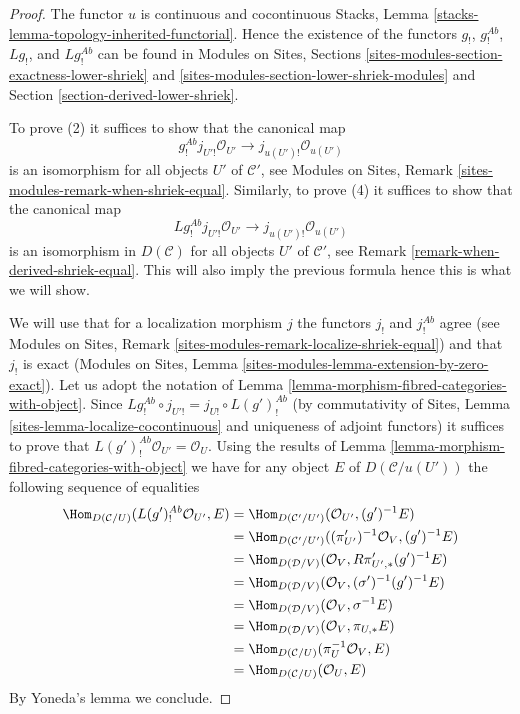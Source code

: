 \begin{proof}
The functor $u$ is continuous and cocontinuous
Stacks, Lemma \ref{stacks-lemma-topology-inherited-functorial}.
Hence the existence of the functors $g_!$, $g_!^{\textit{Ab}}$,
$Lg_!$, and $Lg_!^{\textit{Ab}}$ can be found in
Modules on Sites, Sections
\ref{sites-modules-section-exactness-lower-shriek} and
\ref{sites-modules-section-lower-shriek-modules}
and
Section \ref{section-derived-lower-shriek}.

\medskip\noindent
To prove (2) it suffices to show that the canonical map
$$
g_!^{\textit{Ab}}j_{U'!}\mathcal{O}_{U'} \to j_{u(U')!}\mathcal{O}_{u(U')}
$$
is an isomorphism for all objects $U'$ of $\mathcal{C}'$, see
Modules on Sites, Remark \ref{sites-modules-remark-when-shriek-equal}.
Similarly, to prove (4) it suffices to show that the canonical map
$$
Lg_!^{\textit{Ab}}j_{U'!}\mathcal{O}_{U'} \to j_{u(U')!}\mathcal{O}_{u(U')}
$$
is an isomorphism in $D(\mathcal{C})$ for all objects $U'$ of
$\mathcal{C}'$, see Remark \ref{remark-when-derived-shriek-equal}.
This will also imply the previous formula hence this is what we will show.

\medskip\noindent
We will use that for a localization morphism $j$ the
functors $j_!$ and $j_!^{\textit{Ab}}$ agree (see
Modules on Sites, Remark \ref{sites-modules-remark-localize-shriek-equal})
and that $j_!$ is exact
(Modules on Sites, Lemma \ref{sites-modules-lemma-extension-by-zero-exact}).
Let us adopt the notation of
Lemma \ref{lemma-morphism-fibred-categories-with-object}.
Since $Lg_!^{\textit{Ab}} \circ j_{U'!} = j_{U!} \circ L(g')^{\textit{Ab}}_!$
(by commutativity of Sites, Lemma \ref{sites-lemma-localize-cocontinuous}
and uniqueness of adjoint functors) it suffices to prove that
$L(g')^{\textit{Ab}}_!\mathcal{O}_{U'} = \mathcal{O}_U$. Using the
results of
Lemma \ref{lemma-morphism-fibred-categories-with-object}
we have for any object $E$ of $D(\mathcal{C}/u(U'))$ the following
sequence of equalities
\begin{align*}
\Hom_{D(\mathcal{C}/U)}(L(g')_!^{\textit{Ab}}\mathcal{O}_{U'}, E)
& =
\Hom_{D(\mathcal{C}'/U')}(\mathcal{O}_{U'}, (g')^{-1}E) \\
& =
\Hom_{D(\mathcal{C}'/U')}((\pi'_{U'})^{-1}\mathcal{O}_V, (g')^{-1}E) \\
& =
\Hom_{D(\mathcal{D}/V)}(\mathcal{O}_V, R\pi'_{U', *}(g')^{-1}E) \\
& =
\Hom_{D(\mathcal{D}/V)}(\mathcal{O}_V, (\sigma')^{-1}(g')^{-1}E) \\
& =
\Hom_{D(\mathcal{D}/V)}(\mathcal{O}_V, \sigma^{-1}E) \\
& =
\Hom_{D(\mathcal{D}/V)}(\mathcal{O}_V, \pi_{U, *}E) \\
& =
\Hom_{D(\mathcal{C}/U)}(\pi_U^{-1}\mathcal{O}_V, E) \\
& =
\Hom_{D(\mathcal{C}/U)}(\mathcal{O}_U, E)
\end{align*}
By Yoneda's lemma we conclude.
\end{proof}

